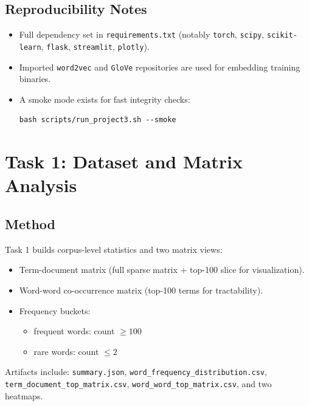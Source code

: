 \documentclass[11pt]{article}
\begin{document}
\subsection{Reproducibility Notes}
\begin{itemize}
    \item Full dependency set in \texttt{requirements.txt} (notably \texttt{torch}, \texttt{scipy}, \texttt{scikit-learn}, \texttt{flask}, \texttt{streamlit}, \texttt{plotly}).
    \item Imported \texttt{word2vec} and \texttt{GloVe} repositories are used for embedding training binaries.
    \item A smoke mode exists for fast integrity checks:
\begin{verbatim}
bash scripts/run_project3.sh --smoke
\end{verbatim}
\end{itemize}

\section{Task 1: Dataset and Matrix Analysis}
\subsection{Method}
Task 1 builds corpus-level statistics and two matrix views:
\begin{itemize}
    \item Term-document matrix (full sparse matrix + top-100 slice for visualization).
    \item Word-word co-occurrence matrix (top-100 terms for tractability).
    \item Frequency buckets:
    \begin{itemize}
        \item frequent words: count \(\geq 100\)
        \item rare words: count \(\leq 2\)
    \end{itemize}
\end{itemize}

Artifacts include:
\texttt{summary.json}, \texttt{word\_frequency\_distribution.csv},
\texttt{term\_document\_top\_matrix.csv}, \texttt{word\_word\_top\_matrix.csv}, and two heatmaps.
\end{document}
